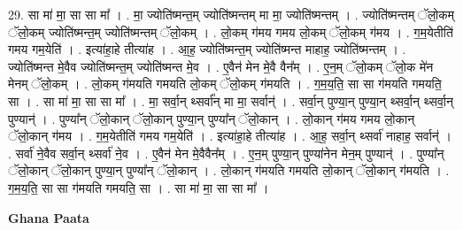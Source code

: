 \documentclass[17pt]{extarticle}
\begin{document}
29. सा मा॑ मा॒ सा सा मा᳚ । . मा॒ ज्योति॑ष्मन्त॒म् ज्योति॑ष्मन्तम् मा मा॒ ज्योति॑ष्मन्तम् । . ज्योति॑ष्मन्तम् ॅलो॒कम् ॅलो॒कम् ज्योति॑ष्मन्त॒म् ज्योति॑ष्मन्तम् ॅलो॒कम् । . लो॒कम् ग॑मय गमय लो॒कम् ॅलो॒कम् ग॑मय । . ग॒म॒येतीति॑ गमय गम॒येति॑ । . इत्या॑हा॒हे तीत्या॑ह । . आ॒ह॒ ज्योति॑ष्मन्त॒म् ज्योति॑ष्मन्त माहाह॒ ज्योति॑ष्मन्तम् । . ज्योति॑ष्मन्त मे॒वैव ज्योति॑ष्मन्त॒म् ज्योति॑ष्मन्त मे॒व । . ए॒वैन॑ मेन मे॒वै वैन᳚म् । . ए॒न॒म् ॅलो॒कम् ॅलो॒क मे॑न मेनम् ॅलो॒कम् । . लो॒कम् ग॑मयति गमयति लो॒कम् ॅलो॒कम् ग॑मयति । . ग॒म॒य॒ति॒ सा सा ग॑मयति गमयति॒ सा । . सा मा॑ मा॒ सा सा मा᳚ । . मा॒ सर्वा॒न् थ्सर्वा᳚न् मा मा॒ सर्वान्॑ । . सर्वा॒न् पुण्या॒न् पुण्या॒न् थ्सर्वा॒न् थ्सर्वा॒न् पुण्यान्॑ । . पुण्या᳚न् ॅलो॒कान् ॅलो॒कान् पुण्या॒न् पुण्या᳚न् ॅलो॒कान् । . लो॒कान् ग॑मय गमय लो॒कान् ॅलो॒कान् ग॑मय । . ग॒म॒येतीति॑ गमय गम॒येति॑ । . इत्या॑हा॒हे तीत्या॑ह । . आ॒ह॒ सर्वा॒न् थ्सर्वा॑ नाहाह॒ सर्वान्॑ । . सर्वा॑ ने॒वैव सर्वा॒न् थ्सर्वा॑ ने॒व । . ए॒वैन॑ मेन मे॒वैवैन᳚म् । . ए॒न॒म् पुण्या॒न् पुण्या॑नेन मेन॒म् पुण्यान्॑ । . पुण्या᳚न् ॅलो॒कान् ॅलो॒कान् पुण्या॒न् पुण्या᳚न् ॅलो॒कान् । . लो॒कान् ग॑मयति गमयति लो॒कान् ॅलो॒कान् ग॑मयति । . ग॒म॒य॒ति॒ सा सा ग॑मयति गमयति॒ सा । . सा मा॑ मा॒ सा सा मा᳚ । \newline

\textbf{Ghana Paata } \newline
\end{document}
